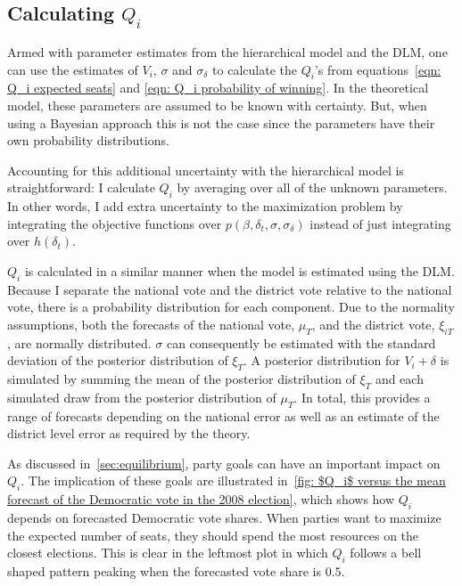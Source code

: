 \documentclass[12pt,final,fleqn]{article}
\theoremstyle{plain}
\begin{document}
\subsection{Calculating $Q_i$} \label{sec: calculating Q}
Armed with parameter estimates from the hierarchical model and the DLM, one can use the estimates of $V_{i}$, $\sigma$ and $\sigma_\delta$ to calculate the $Q_i$'s from equations~\ref{eqn: Q_i expected seats} and \ref{eqn: Q_i probability of winning}. In the theoretical model, these parameters are assumed to be known with certainty. But, when using a Bayesian approach this is not the case since the parameters have their own probability distributions. 

Accounting for this additional uncertainty with the hierarchical model is straightforward: I calculate $Q_i$ by averaging over all of the unknown parameters. In other words, I add extra uncertainty to the maximization problem by integrating the objective functions over $p(\beta, \delta_t, \sigma, \sigma_\delta)$ instead of just integrating over $h(\delta_t)$.

$Q_i$ is calculated in a similar manner when the model is estimated using the DLM. Because I separate the national vote and the district vote relative to the national vote, there is a probability distribution for each component. Due to the normality assumptions, both the forecasts of the national vote, $\mu_T$, and the district vote, $\xi_{iT}$, are normally distributed. $\sigma$ can consequently be estimated with the standard deviation of the posterior distribution of $\xi_T$. A posterior distribution for $V_i + \delta$ is simulated by summing the mean of the posterior distribution of $\xi_T$ and each simulated draw from the posterior distribution of $\mu_T$. In total, this provides a range of forecasts depending on the national error as well as an estimate of the district level error as required by the theory.

As discussed in~\autoref{sec:equilibrium}, party goals can have an important impact on $Q_i$. The implication of these goals are illustrated in~\autoref{fig: $Q_i$ versus the mean forecast of the Democratic vote in the 2008 election}, which shows how $Q_i$ depends on forecasted Democratic vote shares. When parties want to maximize the expected number of seats, they should spend the most resources on the closest elections. This is clear in the leftmost plot in which $Q_i$ follows a bell shaped pattern peaking when the forecasted vote share is $0.5$. 
\end{document}
